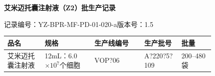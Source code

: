 \documentclass[UTF8,10pt,a4paper,fontset=fandol]{ctexart}
\newcommand{\fieldvalue}[1]{#1}
\newcommand{\handwritten}[1]{#1}
\begin{document}
\begin{center}
\textbf{艾米迈托囊注射液（Z2）批生产记录}
\end{center}

\noindent
记录编号：YZ-BPR-MF-PD-01-020-a\hfill 版本号：1.5

\begin{tabular}{|p{0.18\linewidth}|p{0.24\linewidth}|p{0.24\linewidth}|p{0.18\linewidth}|}
\hline
品名 & 规格 & 生产线编号 & 生产批号 & 批量 \\
\hline
艾米迈托囊注射液 & 12mL：6.0$\times10^{7}$个细胞 &
\fieldvalue{\handwritten{VOP?06}} &
\fieldvalue{\handwritten{A?220?5?109}} &
200--480袋 \\
\hline
\end{tabular}

\bigskip
\end{document}
